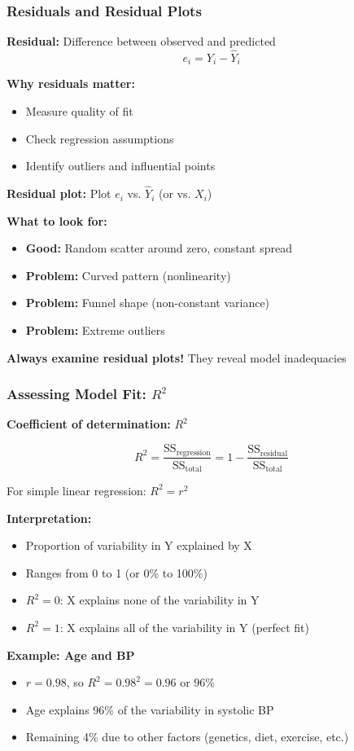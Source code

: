\documentclass{beamer}
\begin{document}
\begin{frame}
\frametitle{Residuals and Residual Plots}
\textbf{Residual:} Difference between observed and predicted
$$e_i = Y_i - \hat{Y}_i$$

\vspace{0.3cm}
\textbf{Why residuals matter:}
\begin{itemize}
\item Measure quality of fit
\item Check regression assumptions
\item Identify outliers and influential points
\end{itemize}

\vspace{0.5cm}
\textbf{Residual plot:} Plot $e_i$ vs. $\hat{Y}_i$ (or vs. $X_i$)

\vspace{0.3cm}
\textbf{What to look for:}
\begin{itemize}
\item \textbf{Good:} Random scatter around zero, constant spread
\item \textbf{Problem:} Curved pattern (nonlinearity)
\item \textbf{Problem:} Funnel shape (non-constant variance)
\item \textbf{Problem:} Extreme outliers
\end{itemize}

\vspace{0.3cm}
\textbf{Always examine residual plots!} They reveal model inadequacies
\end{frame}

\begin{frame}
\frametitle{Assessing Model Fit: $R^2$}
\textbf{Coefficient of determination:} $R^2$

\vspace{0.3cm}
$$R^2 = \frac{\text{SS}_{\text{regression}}}{\text{SS}_{\text{total}}} = 1 - \frac{\text{SS}_{\text{residual}}}{\text{SS}_{\text{total}}}$$

For simple linear regression: $R^2 = r^2$

\vspace{0.5cm}
\textbf{Interpretation:}
\begin{itemize}
\item Proportion of variability in Y explained by X
\item Ranges from 0 to 1 (or 0\% to 100\%)
\item $R^2 = 0$: X explains none of the variability in Y
\item $R^2 = 1$: X explains all of the variability in Y (perfect fit)
\end{itemize}

\vspace{0.3cm}
\textbf{Example: Age and BP}
\begin{itemize}
\item $r = 0.98$, so $R^2 = 0.98^2 = 0.96$ or 96\%
\item Age explains 96\% of the variability in systolic BP
\item Remaining 4\% due to other factors (genetics, diet, exercise, etc.)
\end{itemize}
\end{frame}
\end{document}
